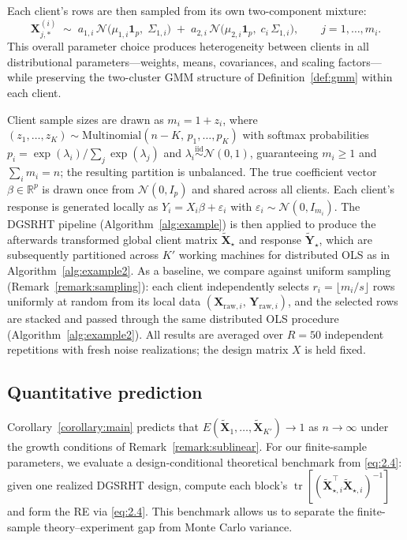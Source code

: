 \documentclass[11pt]{article}
\numberwithin{equation}{section}
\theoremstyle{plain}
\theoremstyle{definition}
\theoremstyle{remark}
\begin{document}
Each client's rows are then sampled from its own two-component mixture:
\[
  \mathbf{X}_{j,*}^{(i)} \;\sim\;
  a_{1,i}\,\mathcal{N}\!\bigl(\mu_{1,i}\mathbf{1}_p,\;\Sigma_{1,i}\bigr)
  \;+\;
  a_{2,i}\,\mathcal{N}\!\bigl(\mu_{2,i}\mathbf{1}_p,\;c_i\,\Sigma_{1,i}\bigr),
  \qquad j=1,\ldots,m_i.
\]
This overall parameter choice produces heterogeneity between clients in all distributional parameters---weights, means, covariances, and scaling factors---while preserving the two-cluster GMM structure of Definition~\ref{def:gmm} within each client.

Client sample sizes are drawn as $m_i = 1 + z_i$, where $(z_1,\ldots,z_K)\sim\mathrm{Multinomial}(n-K,\,p_1,\ldots,p_K)$ with softmax probabilities $p_i = \exp(\lambda_i)/\sum_{j}\exp(\lambda_j)$ and $\lambda_i\overset{\mathrm{iid}}{\sim}\mathcal{N}(0,1)$, guaranteeing $m_i\ge 1$ and $\sum_i m_i = n$; the resulting partition is unbalanced.
The true coefficient vector $\beta\in\mathbb{R}^p$ is drawn once from $\mathcal{N}(0,I_p)$ and shared across all clients. Each client's response is generated locally as $Y_i = X_i\beta + \varepsilon_i$ with $\varepsilon_i\sim\mathcal{N}(0,I_{m_i})$.
The DGSRHT pipeline (Algorithm~\ref{alg:example}) is then applied to produce the afterwards transformed global client matrix $\tilde{\mathbf{X}}_\star$ and response $\tilde{\mathbf{Y}}_\star$, which are subsequently partitioned across $K'$ working machines for distributed OLS as in Algorithm~\ref{alg:example2}.
As a baseline, we compare against uniform sampling (Remark~\ref{remark:sampling}): each client independently selects $r_i = \lfloor m_i/s \rfloor$ rows uniformly at random from its local data $(\mathbf{X}_{\mathrm{raw},i},\,\mathbf{Y}_{\mathrm{raw},i})$, and the selected rows are stacked and passed through the same distributed OLS procedure (Algorithm~\ref{alg:example2}).
All results are averaged over $R=50$ independent repetitions with fresh noise realizations; the design matrix $X$ is held fixed.

\subsection{Quantitative prediction}

Corollary~\ref{corollary:main} predicts that $E(\tilde{\mathbf{X}}_1,\ldots,\tilde{\mathbf{X}}_{K'})\to 1$ as $n\to\infty$ under the growth conditions of Remark~\ref{remark:sublinear}. For our finite-sample parameters, we evaluate a design-conditional theoretical benchmark from \eqref{eq:2.4}: given one realized DGSRHT design, compute each block's $\operatorname{tr}[(\tilde{\mathbf{X}}_{\star,i}^\top\tilde{\mathbf{X}}_{\star,i})^{-1}]$ and form the RE via \eqref{eq:2.4}. This benchmark allows us to separate the finite-sample theory--experiment gap from Monte Carlo variance.
\end{document}
